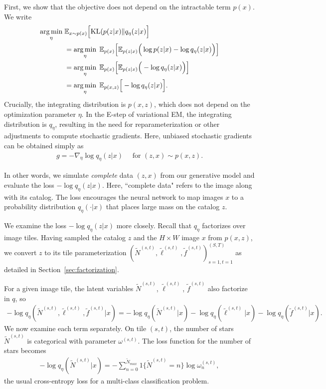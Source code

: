 First, we show that the objective does not depend on the intractable term $p(x)$. 
We write
\begin{align}
 \operatorname*{arg\,min}_{\eta} \; & \mathbb{E}_{x \sim p(x)}\Big[ \mathrm{KL}(p(z | x) \| q_\eta(z | x)\Big] \\
  &=\operatorname*{arg\,min}_{\eta} \; \mathbb E_{p(x)}\Big[\mathbb E_{p(z | x)}\Big(\log p(z | x) - \log q_\eta(z | x) \Big)\Big]\\
&=\operatorname*{arg\,min}_{\eta} \; \mathbb E_{p(x)}\Big[\mathbb E_{p(z | x)}\Big( - \log q_\eta(z | x) \Big)\Big]\\
&=\operatorname*{arg\,min}_{\eta} \; \mathbb E_{p(x, z)}\Big[- \log q_\eta(z | x) \Big]\label{eq:sleep_loss_simple}.
\end{align}
Crucially, the integrating distribution is $p(x,z)$, which does not depend on the optimization parameter $\eta$.
In the E-step of variational EM, the integrating distribution is $q_\eta$, resulting in the need for reparameterization or other adjustments to compute stochastic gradients. 
Here, unbiased stochastic gradients can be obtained simply as 
\begin{align}
    g = -\nabla_\eta \log q_\eta(z | x) \quad \text{ for } (z, x)\sim p(x, z).
\end{align}

In other words, we simulate {\itshape complete} data $(z, x)$ from our generative model and evaluate the loss $-\log q_\eta(z | x)$. 
Here, ``complete data" refers to the image along with its catalog. 
The loss encourages the neural network to map images $x$ to a probability distribution $q_{\eta}(\cdot | x)$ that places large mass on the catalog $z$.

We examine the loss $-\log q_\eta(z | x)$ more closely. Recall that $q_\eta$ factorizes over image tiles. Having sampled the catalog $z$ 
and the $H\times W$ image $x$ from $p(x,z)$, we convert $z$ to its tile parameterization $(\tilde N^{(s,t)}, \tilde \ell^{(s,t)}, \tilde f^{(s,t)})_{s=1,t=1}^{(S,T)}$ as detailed in Section~\ref{sec:factorization}.

For a given image tile, the latent variables $\tilde N^{(s,t)}$, $\tilde \ell^{(s,t)}$, $\tilde f^{(s,t)}$ also factorize in $q$, so 
\begin{align}
- \log q_\eta(\tilde N^{(s,t)}, 
                \tilde \ell^{(s,t)}, \tilde f^{(s,t)} | x) 
=   - \log q_\eta(\tilde N^{(s,t)} | x) 
        - \log q_\eta(\tilde \ell^{(s,t)} | x) 
        - \log q_\eta(\tilde f^{(s,t)} | x). 
        \label{eq:sleep_loss_decomp}
\end{align}
We now examine each term separately. On tile $(s,t)$, the number of stars $\tilde N^{(s,t)}$ is categorical with parameter $\omega^{(s,t)}$. The loss function for the number of stars becomes
\begin{align}
    - \log q_\eta(\tilde N^{(s,t)} | x) = -\sum_{n = 0}^{\tilde N_{max}} 1\{\tilde N^{(s,t)} = n\} \log \omega^{(s,t)}_n, 
    \label{eq:cross_entropy_loss}
\end{align}
the usual cross-entropy loss for a multi-class classification problem. 

